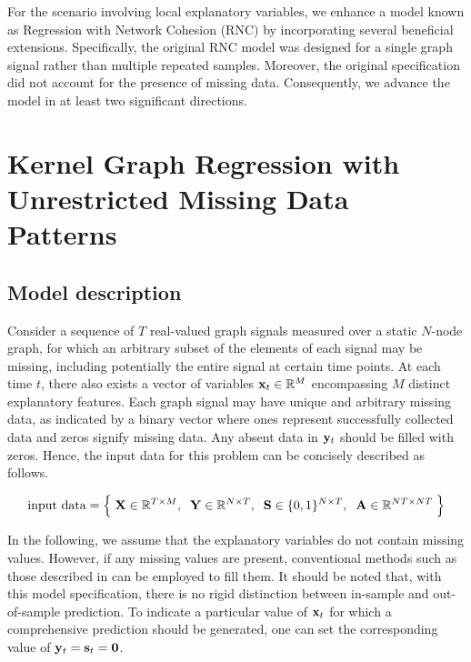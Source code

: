 For the scenario involving local explanatory variables, we enhance a model known as Regression with Network Cohesion (RNC) \citep{Li2019,Le2022} by incorporating several beneficial extensions. Specifically, the original RNC model was designed for a single graph signal rather than multiple repeated samples. Moreover, the original specification did not account for the presence of missing data. Consequently, we advance the model in at least two significant directions.

\section{Kernel Graph Regression with Unrestricted Missing Data Patterns}

\label{sec:kgr_mdp}

\subsection{Model description}

\label{sec:kgr_model_desc}

Consider a sequence of $T$ real-valued graph signals measured over a static $N$-node graph, for which an arbitrary subset of the elements of each signal may be missing, including potentially the entire signal at certain time points. At each time $t$, there also exists a vector of variables $\mathbf{x}_t \in \mathbb{R}^M$ encompassing $M$ distinct explanatory features. Each graph signal may have unique and arbitrary missing data, as indicated by a binary vector where ones represent successfully collected data and zeros signify missing data. Any absent data in $\mathbf{y}_t$ should be filled with zeros. Hence, the input data for this problem can be concisely described as follows. 


\begin{equation*}
    \text{input data} = \Big\{ \; \mathbf{X} \in \mathbb{R}^{T \times M}, \;\; \mathbf{Y} \in \mathbb{R}^{N \times T}, \;\; \mathbf{S} \in \{0, 1\}^{N \times T} , \;\; \mathbf{A} \in \mathbb{R}^{NT \times NT} \; \Big\}
\end{equation*}


 In the following, we assume that the explanatory variables do not contain missing values. However, if any missing values are present, conventional methods such as those described in \cite{Little2019} can be employed to fill them. It should be noted that, with this model specification, there is no rigid distinction between in-sample and out-of-sample prediction. To indicate a particular value of $\mathbf{x}_t$ for which a comprehensive prediction should be generated, one can set the corresponding value of $\mathbf{y}_t = \mathbf{s}_t = \mathbf{0}$. 

